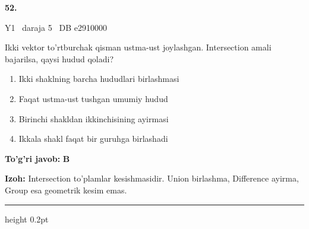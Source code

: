 \documentclass[10pt,a4paper,oneside]{article}
\begin{document}
\hypertarget{q52}{\textbf{\color{ink}52.}}  {\color{muted}\scriptsize Y1 \textbullet\ daraja 5 \textbullet\ DB e2910000}
\par
Ikki vektor to'rtburchak qisman ustma-ust joylashgan. Intersection amali bajarilsa, qaysi hudud qoladi?
\begin{enumerate}[label=\Alph*),leftmargin=9mm]
\item Ikki shaklning barcha hududlari birlashmasi
\item Faqat ustma-ust tushgan umumiy hudud
\item Birinchi shakldan ikkinchisining ayirmasi
\item Ikkala shakl faqat bir guruhga birlashadi
\end{enumerate}
\begin{tcolorbox}[enhanced,breakable,colback=teal!4,colframe=teal!45!black,boxrule=0.45pt,arc=1.2mm,left=2.8mm,right=2.8mm,top=2mm,bottom=2mm,before skip=2mm,after skip=2mm]
\textbf{\color{teal}To'g'ri javob:} \textbf{B}
\par\smallskip
\textbf{Izoh:} Intersection to'plamlar kesishmasidir. Union birlashma, Difference ayirma, Group esa geometrik kesim emas.
\end{tcolorbox}
\vspace{2mm}\hrule height 0.2pt \vspace{4mm}
\end{document}
